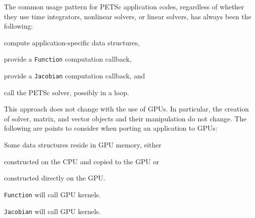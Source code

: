 \documentclass[10pt,journal,compsoc]{IEEEtran}
\newenvironment{titemize} %
        {\begin{list}{\labelitemi}{
                \setlength{\topsep}{0pt}
                \setlength{\parskip}{0pt}
                \setlength{\itemsep}{0pt}
                \setlength{\parsep}{0pt}
                \setlength{\leftmargin}{23pt}
                \setlength{\labelwidth}{23pt}
        }}
        {\end{list}}
\begin{document}
The common usage pattern for PETSc application codes, regardless of whether they
use time integrators, nonlinear solvers, or linear solvers, has always
been the following: 
\begin{titemize}
    \item compute application-specific data structures,
    \item provide a {\tt  Function} computation callback, 
    \item provide a {\tt  Jacobian} computation callback, and
    \item call the PETSc solver, possibly in a loop.
\end{titemize}
This approach does not change with the use of GPUs.  In particular, the creation of
solver, matrix, and vector objects and their manipulation do not
change. The following are points to consider when porting an application to GPUs:
\begin{titemize}
    \item Some data structures reside in GPU memory, either
    \begin{titemize}
        \item constructed on the CPU and copied to the GPU or
        \item constructed directly on the GPU.
    \end{titemize}
    \item {\tt  Function} will call GPU kernels.
    \item {\tt  Jacobian} will call GPU kernels.
\end{titemize}
\end{document}
